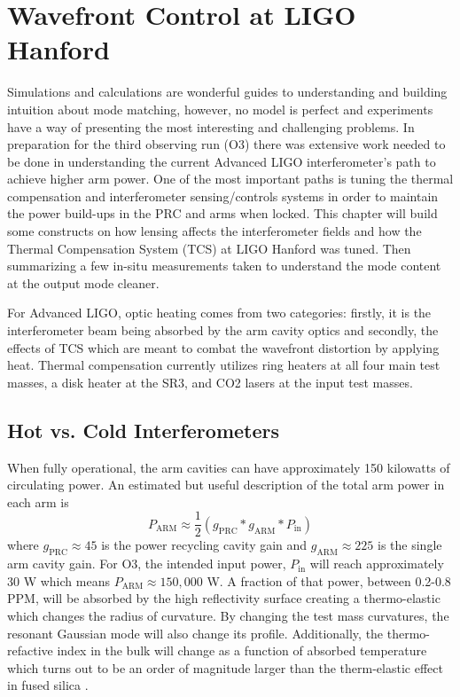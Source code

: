 \chapter{Wavefront Control at LIGO Hanford}\label{chapter:MM_LHO}
	Simulations and calculations are wonderful guides to understanding and building intuition about mode matching, however, no model is perfect and experiments have a way of presenting the most interesting and challenging problems.  In preparation for the third observing run (O3) there was extensive work needed to be done in understanding the current Advanced LIGO interferometer's path to achieve higher arm power.  One of the most important paths is tuning the thermal compensation and interferometer sensing/controls systems in order to maintain the power build-ups in the PRC and arms when locked.  This chapter will build some constructs on how lensing affects the interferometer fields and how the Thermal Compensation System (TCS) at LIGO Hanford was tuned. Then summarizing a few in-situ measurements taken to understand the mode content at the output mode cleaner.
	
	For Advanced LIGO, optic heating comes from two categories: firstly, it is the interferometer beam being absorbed by the arm cavity optics and secondly, the effects of TCS which are meant to combat the wavefront distortion by applying heat.  Thermal compensation currently utilizes ring heaters at all four main test masses, a disk heater at the SR3, and CO2 lasers at the input test masses.
	
	\section{Hot vs. Cold Interferometers}\label{sec:hotcoldifo}
	When fully operational, the arm cavities can have approximately 150 kilowatts of circulating power. An estimated but useful description of the total arm power in each arm is
	\begin{equation}
		P_{\text{ARM}} \approx \frac{1}{2} (g_{\text{PRC}} * g_{\text{ARM}} * P_{\text{in}})
	\end{equation}
	where $g_{\text{PRC}} \approx 45$ is the power recycling cavity gain and $g_{\text{ARM}} \approx 225$ is the single arm cavity gain. For O3, the intended input power, $P_{\text{in}}$ will reach approximately 30 W which means $P_{\text{ARM}} \approx 150,000$ W. A fraction of that power, between 0.2-0.8 PPM, will be absorbed by the high reflectivity surface creating a thermo-elastic which changes the radius of curvature. By changing the test mass curvatures, the resonant Gaussian mode will also change its profile. Additionally, the thermo-refactive index in the bulk will change as a function of absorbed temperature which turns out to be an order of magnitude larger than the therm-elastic effect in fused silica \cite{winkler_thermaldist}.
	
